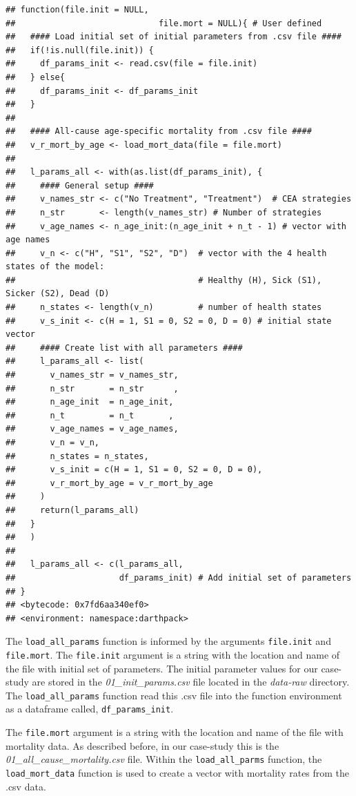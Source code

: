 \documentclass[]{book}
\begin{document}
\begin{verbatim}
## function(file.init = NULL,
##                             file.mort = NULL){ # User defined
##   #### Load initial set of initial parameters from .csv file ####
##   if(!is.null(file.init)) {
##     df_params_init <- read.csv(file = file.init)
##   } else{
##     df_params_init <- df_params_init
##   }
##   
##   #### All-cause age-specific mortality from .csv file ####
##   v_r_mort_by_age <- load_mort_data(file = file.mort)
##   
##   l_params_all <- with(as.list(df_params_init), {
##     #### General setup ####
##     v_names_str <- c("No Treatment", "Treatment")  # CEA strategies
##     n_str       <- length(v_names_str) # Number of strategies
##     v_age_names <- n_age_init:(n_age_init + n_t - 1) # vector with age names
##     v_n <- c("H", "S1", "S2", "D")  # vector with the 4 health states of the model:
##                                     # Healthy (H), Sick (S1), Sicker (S2), Dead (D)
##     n_states <- length(v_n)         # number of health states 
##     v_s_init <- c(H = 1, S1 = 0, S2 = 0, D = 0) # initial state vector
##     #### Create list with all parameters ####
##     l_params_all <- list(
##       v_names_str = v_names_str,
##       n_str       = n_str      ,
##       n_age_init  = n_age_init, 
##       n_t         = n_t       , 
##       v_age_names = v_age_names,
##       v_n = v_n,
##       n_states = n_states,
##       v_s_init = c(H = 1, S1 = 0, S2 = 0, D = 0),
##       v_r_mort_by_age = v_r_mort_by_age
##     )
##     return(l_params_all)
##   }
##   )
##   
##   l_params_all <- c(l_params_all, 
##                     df_params_init) # Add initial set of parameters
## }
## <bytecode: 0x7fd6aa340ef0>
## <environment: namespace:darthpack>
\end{verbatim}

The \texttt{load\_all\_params} function is informed by the arguments
\texttt{file.init} and \texttt{file.mort}. The \texttt{file.init}
argument is a string with the location and name of the file with initial
set of parameters. The initial parameter values for our case-study are
stored in the \emph{01\_init\_params.csv} file located in the
\emph{data-raw} directory. The \texttt{load\_all\_params} function read
this .csv file into the function environment as a dataframe called,
\texttt{df\_params\_init}.

The \texttt{file.mort} argument is a string with the location and name
of the file with mortality data. As described before, in our case-study
this is the \emph{01\_all\_cause\_mortality.csv} file. Within the
\texttt{load\_all\_parms} function, the \texttt{load\_mort\_data}
function is used to create a vector with mortality rates from the .csv
data.
\end{document}
